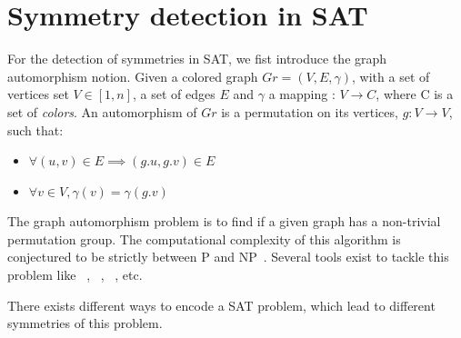 %
%
%
\section{Symmetry detection in SAT}
For the detection of symmetries in SAT, we fist introduce the graph automorphism notion.
Given a colored graph $Gr = (V, E, \gamma)$, with a set of vertices set $V \in  [1, n] $, a set of edges $E$ and
$\gamma$ a mapping : $V \rightarrow C$, where C is a set of \emph{colors}.
An automorphism of $Gr$ is a permutation on its vertices, $g :V \rightarrow V$,
such that:
\begin{itemize}
 \item $\forall (u, v) \in E \implies (g.u, g.v) \in E$
 \item $\forall v \in V, \gamma(v) = \gamma(g.v)$
\end{itemize}
The graph automorphism problem is to find if a given graph has a non-trivial permutation group. 
The computational complexity of this algorithm is conjectured to be strictly between P and NP~\cite{kobler2012graph,toran2004hardness}.
Several tools exist to tackle this problem like \saucy~\cite{katebi2010symmetry},
\bliss~\cite{JunttilaKaski:ALENEX2007}, \nauty~\cite{mckay2003nauty}, etc.

There exists different ways to encode a SAT problem, which lead to different symmetries of this problem.

